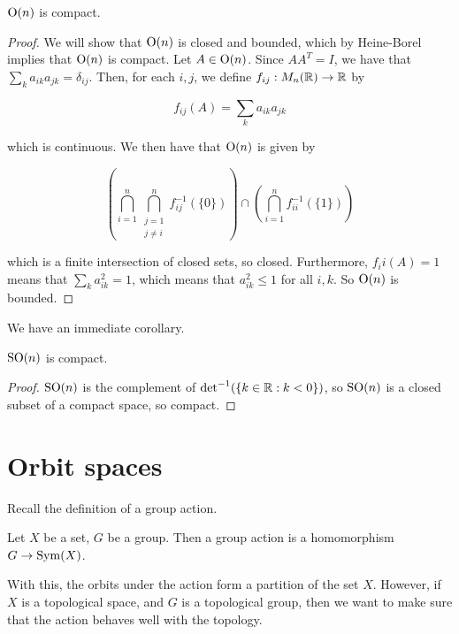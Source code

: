 \documentclass{article}
\begin{document}
    \begin{theorem}
        \label{orthogonal_group_is_compact}

        $\operatorname{O}(n)$ is compact.
    \end{theorem}

    \begin{proof}
        We will show that $\operatorname{O}(n)$ is closed and bounded, which by Heine-Borel implies that $\operatorname{O}(n)$ is compact. Let $A \in \operatorname{O}(n)$. Since $AA^T = I$, we have that $\sum_k a_{ik}a_{jk} = \delta_{ij}$. Then, for each $i, j$, we define $f_{ij} : M_n(\mathbb{R}) \to \mathbb{R}$ by

        $$f_{ij}(A) = \sum_{k} a_{ik}a_{jk}$$

        which is continuous. We then have that $\operatorname{O}(n)$ is given by

        $$\left(\bigcap_{i=1}^n \bigcap_{\substack{j=1 \\ j \ne i}}^n f^{-1}_{ij}(\{0\})\right) \cap \left(\bigcap_{i=1}^n f_{ii}^{-1}(\{1\})\right)$$

        which is a finite intersection of closed sets, so closed. Furthermore, $f_ii(A) = 1$ means that $\sum_k a_{ik}^2 = 1$, which means that $a_{ik}^2 \le 1$ for all $i, k$. So $\operatorname{O}(n)$ is bounded.
    \end{proof}

    We have an immediate corollary.

    \begin{corollary}
        $\operatorname{SO}(n)$ is compact.
    \end{corollary}

    \begin{proof}
        $\operatorname{SO}(n)$ is the complement of $\det^{-1}(\{k \in \mathbb{R} : k < 0\})$, so $\operatorname{SO}(n)$ is a closed subset of a compact space, so compact.
    \end{proof}

    \section{Orbit spaces}

    Recall the definition of a group action.

    \begin{definition}

        Let $X$ be a set, $G$ be a group. Then a group action is a homomorphism $G \to \operatorname{Sym}(X)$.
    \end{definition}

    With this, the orbits under the action form a partition of the set $X$. However, if $X$ is a topological space, and $G$ is a topological group, then we want to make sure that the action behaves well with the topology.
\end{document}
